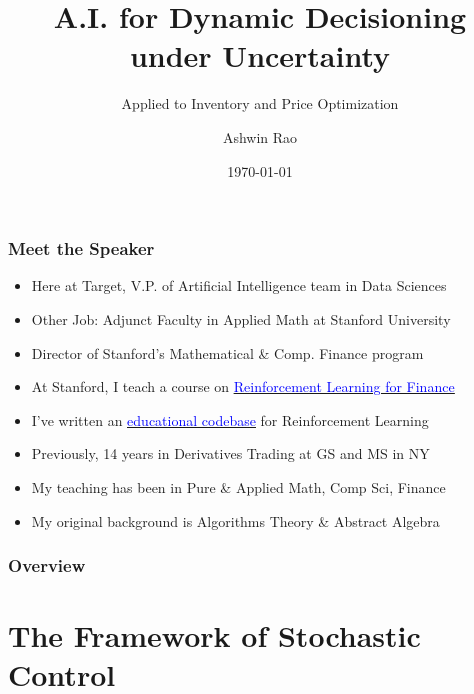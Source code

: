 \documentclass[handout]{beamer}
\title[A.I. For Retail]{A.I. for Dynamic Decisioning under Uncertainty} %
\subtitle{Applied to Inventory and Price Optimization}
\author{Ashwin Rao} %
\institute[Target/Stanford] %
{V.P. Artificial Intelligence at Target \& Adjunct Faculty at Stanford
}
\date{\today} %
\begin{document}
\begin{frame}
\titlepage %
\end{frame}

\begin{frame}
\frametitle{Meet the Speaker}
\pause
\begin{itemize}[<+->]
\item Here at Target, V.P. of Artificial Intelligence team in Data Sciences
\item Other Job: Adjunct Faculty in Applied Math at Stanford University
\item Director of Stanford's Mathematical \& Comp. Finance program
\item At Stanford, I teach a course on \href{https://github.com/coverdrive/technical-documents/blob/master/finance/cme241/Stanford-CME241.pdf}{\underline{\textcolor{blue}{Reinforcement Learning for Finance}}}
\item I've written an \href{https://github.com/coverdrive/MDP-DP-RL}{\underline{\textcolor{blue}{educational codebase}}} for Reinforcement Learning
\item Previously, 14 years in Derivatives Trading at GS and MS in NY
\item My teaching has been in Pure \& Applied Math, Comp Sci, Finance
\item My original background is Algorithms Theory \& Abstract Algebra
\end{itemize}
\end{frame}

\begin{frame}
\frametitle{Overview} %
\tableofcontents %
\end{frame}

\section{The Framework of Stochastic Control}
\end{document}

